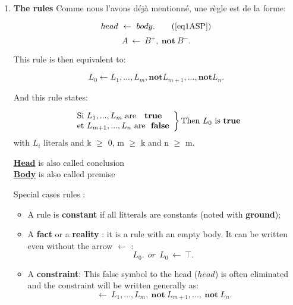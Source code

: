 \begin{enumerate}
\item \textbf{The rules}
Comme nous l’avons déjà mentionné, une règle est de la forme:


\begin{equation} 
head ~ \leftarrow ~ body.
\tag{\eqref{eq1ASP}}
\end{equation}
\begin{equation} \label{eq3ASP}
A ~ \leftarrow ~ B^+, ~ \textbf{not} ~ B^-.
\end{equation}

This rule is then equivalent to:

\begin{equation} \label{eq2ASP}
L_{0} \leftarrow L_{1},...,L_{m}, \textbf{not} L_{m+1},..., \textbf{not} L_{n}.
\end{equation}

And this rule states:

$$
\left.
    \begin{array}{ll}
        \text{Si} ~ L_{1},...,L_{m} ~ \text{are ~ \textbf{true}}\\
        \text{et} ~ L_{m+1},...,L_{n} ~ \text{are~ \textbf{false}}
    \end{array}
\right \} \text{Then} ~ L_{0} ~ \text{is } \textbf{true} 
$$
with $L_{i}$ literals and k $\geq$ 0, m $\geq$ k and n $\geq$ m.

\underline{\textbf{Head}} is also called conclusion \\
\underline{\textbf{Body}} is also called premise 

Special cases rules \cite{Vladimir, baral2003knowledge} :\\

\begin{itemize}
\item A rule is \textbf{constant} if all litterals are constants (noted with \textbf{ground});
\item A \textbf{fact} or a \textbf{reality} : it is a rule with an empty body. It can be written even without the arrow $\leftarrow$ :\\
\begin{equation} 
L_{0}. ~~ or ~~ L_{0} ~ \leftarrow ~  \top.
 \label{eq5ASP}
\end{equation}

\item A \textbf{constraint}:
This false symbol to the head ($head$) is often eliminated and the constraint will be written generally as:
\begin{equation} 
 ~ \leftarrow ~ L_{1},...,L_{m}, ~ \textbf{not} ~ L_{m+1},..., ~\textbf{not} ~L_{n}.
 \label{eq6ASP}
\end{equation}


\end{itemize}
\end{enumerate}
